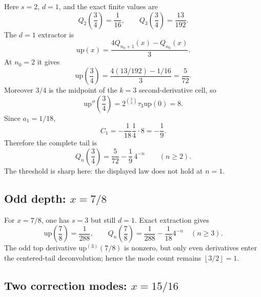 \documentclass[11pt,oneside]{article}
\numberwithin{equation}{section}
\theoremstyle{definition}
\theoremstyle{remark}
\newcommand{\upf}{\mathrm{up}}
\newcommand{\floor}[1]{\left\lfloor #1\right\rfloor}
\newcommand{\TM}{\tau}
\begin{document}
Here $s=2$, $d=1$, and the exact finite values are
\begin{equation}
 Q_2\!\left(\frac34\right)=\frac1{16},
 \qquad
 Q_3\!\left(\frac34\right)=\frac{13}{192}.
 \label{eq:three-quarter-data}
\end{equation}
The $d=1$ extractor is
\begin{equation}
 \upf(x)=\frac{4Q_{n_0+1}(x)-Q_{n_0}(x)}3.
 \label{eq:d1-extractor}
\end{equation}
At $n_0=2$ it gives
\begin{equation}
 \upf\!\left(\frac34\right)
 =\frac{4(13/192)-1/16}{3}=\frac5{72}.
 \label{eq:up-three-quarter}
\end{equation}
Moreover $3/4$ is the midpoint of the $k=3$ second-derivative cell, so
\begin{equation}
 \upf''\!\left(\frac34\right)=2^{\binom32}\TM_3\upf(0)=8.
 \label{eq:second-derivative-three-quarter}
\end{equation}
Since $a_1=1/18$,
\begin{equation}
 C_1=-\frac1{18}\frac14\cdot8=-\frac19.
\end{equation}
Therefore the complete tail is
\begin{equation}
 \boxed{\displaystyle
 Q_n\!\left(\frac34\right)=\frac5{72}-\frac19\,4^{-n}
 \qquad(n\ge2).}
 \label{eq:three-quarter-law}
\end{equation}
The threshold is sharp here: the displayed law does not hold at $n=1$.

\subsection{Odd depth: \texorpdfstring{$x=7/8$}{x = 7/8}}

For $x=7/8$, one has $s=3$ but still $d=1$.  Exact extraction gives
\begin{equation}
 \upf\!\left(\frac78\right)=\frac1{288},
 \qquad
 Q_n\!\left(\frac78\right)=\frac1{288}-\frac1{18}4^{-n}
 \quad(n\ge3).
 \label{eq:seven-eighths-law}
\end{equation}
The odd top derivative $\upf^{(3)}(7/8)$ is nonzero, but only even derivatives
enter the centered-tail deconvolution; hence the mode count remains
$\floor{3/2}=1$.

\subsection{Two correction modes: \texorpdfstring{$x=15/16$}{x = 15/16}}
\end{document}

